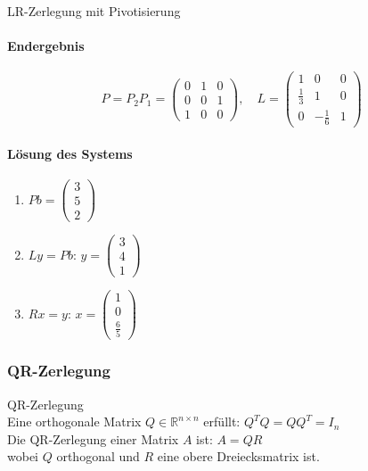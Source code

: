 \begin{example2}{LR-Zerlegung mit Pivotisierung}
\paragraph{Endergebnis}
$$P = P_2P_1 = \begin{pmatrix}
0 & 1 & 0\\
0 & 0 & 1\\
1 & 0 & 0
\end{pmatrix}, \quad
L = \begin{pmatrix}
1 & 0 & 0\\
\frac{1}{3} & 1 & 0\\
0 & -\frac{1}{6} & 1
\end{pmatrix}$$

\paragraph{Lösung des Systems}
\begin{enumerate}
    \item $Pb = \begin{pmatrix} 3\\ 5\\ 2 \end{pmatrix}$
    \item $Ly = Pb$: $y = \begin{pmatrix} 3\\ 4\\ 1 \end{pmatrix}$
    \item $Rx = y$: $x = \begin{pmatrix} 1\\ 0\\ \frac{6}{5} \end{pmatrix}$
\end{enumerate}
\end{example2}

\columnbreak

\subsubsection{QR-Zerlegung}

\begin{concept}{QR-Zerlegung}\\
Eine orthogonale Matrix $Q \in \mathbb{R}^{n\times n}$ erfüllt: $Q^T Q = QQ^T = I_n$
\vspace{1mm}\\
Die QR-Zerlegung einer Matrix $A$ ist: $A = QR$
\vspace{1mm}\\
wobei $Q$ orthogonal und $R$ eine obere Dreiecksmatrix ist.
\end{concept}

